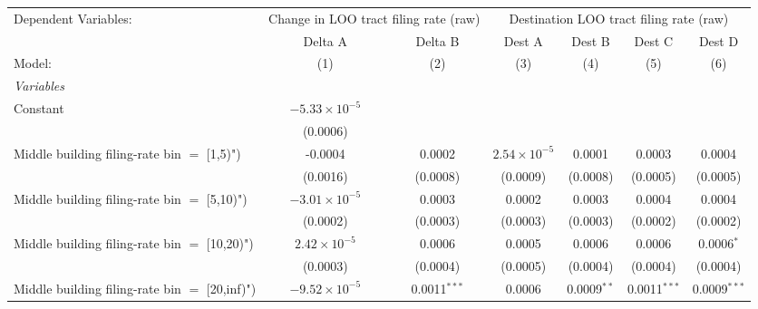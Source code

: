 \begingroup
\centering
\begin{tabular}{lcccccc}
   \tabularnewline \midrule \midrule
   Dependent Variables: & \multicolumn{2}{c}{Change in LOO tract filing rate (raw)} & \multicolumn{4}{c}{Destination LOO tract filing rate (raw)}\\
                                                  & Delta A                & Delta B        & Dest A                & Dest B         & Dest C         & Dest D \\   
   Model:                                         & (1)                    & (2)            & (3)                   & (4)            & (5)            & (6)\\  
   \midrule
   \emph{Variables}\\
   Constant                                       & $-5.33\times 10^{-5}$  &                &                       &                &                &   \\   
                                                  & (0.0006)               &                &                       &                &                &   \\   
   Middle building filing-rate bin $=$ [1,5)")    & -0.0004                & 0.0002         & $2.54\times 10^{-5}$  & 0.0001         & 0.0003         & 0.0004\\   
                                                  & (0.0016)               & (0.0008)       & (0.0009)              & (0.0008)       & (0.0005)       & (0.0005)\\   
   Middle building filing-rate bin $=$ [5,10)")   & $-3.01\times 10^{-5}$  & 0.0003         & 0.0002                & 0.0003         & 0.0004         & 0.0004\\   
                                                  & (0.0002)               & (0.0003)       & (0.0003)              & (0.0003)       & (0.0002)       & (0.0002)\\   
   Middle building filing-rate bin $=$ [10,20)")  & $2.42\times 10^{-5}$   & 0.0006         & 0.0005                & 0.0006         & 0.0006         & 0.0006$^{*}$\\   
                                                  & (0.0003)               & (0.0004)       & (0.0005)              & (0.0004)       & (0.0004)       & (0.0004)\\   
   Middle building filing-rate bin $=$ [20,inf)") & $-9.52\times 10^{-5}$  & 0.0011$^{***}$ & 0.0006                & 0.0009$^{**}$  & 0.0011$^{***}$ & 0.0009$^{***}$\\   

\end{tabular}
